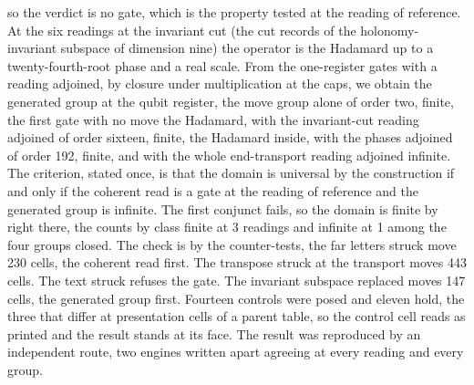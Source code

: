 \begin{chproof}[census]
so the verdict is no gate, which is the property tested at the reading of reference. At the six readings at the invariant cut (the cut records of the holonomy-invariant subspace of dimension nine) the operator is the Hadamard up to a twenty-fourth-root phase and a real scale. From the one-register gates with a reading adjoined, by closure under multiplication at the caps, we obtain the generated group at the qubit register, the move group alone of order two, finite, the first gate with no move the Hadamard, with the invariant-cut reading adjoined of order sixteen, finite, the Hadamard inside, with the phases adjoined of order 192, finite, and with the whole end-transport reading adjoined infinite. The criterion, stated once, is that the domain is universal by the construction if and only if the coherent read is a gate at the reading of reference and the generated group is infinite. The first conjunct fails, so the domain is finite by right there, the counts by class finite at 3 readings and infinite at 1 among the four groups closed.
The check is by the counter-tests, the far letters struck move 230 cells, the coherent read first. The transpose struck at the transport moves 443 cells. The text struck refuses the gate. The invariant subspace replaced moves 147 cells, the generated group first. Fourteen controls were posed and eleven hold, the three that differ at presentation cells of a parent table, so the control cell reads as printed and the result stands at its face.
The result was reproduced by an independent route, two engines written apart agreeing at every reading and every group.
\end{chproof}

\par\medskip{}\label{narr:close:13-3}\par
